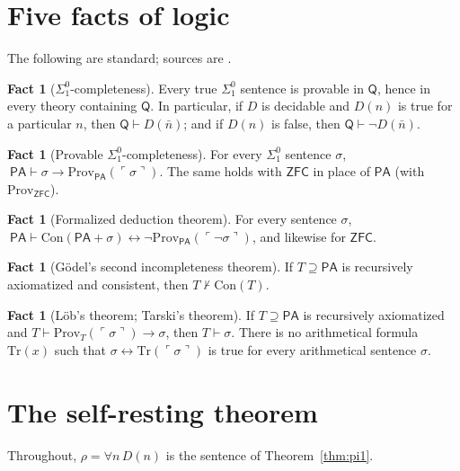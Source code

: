 \documentclass[11pt]{article}
\theoremstyle{definition}
\newtheorem{fact}[theorem]{Fact}
\theoremstyle{remark}
\newcommand{\PA}{\mathsf{PA}}
\newcommand{\ZFC}{\mathsf{ZFC}}
\newcommand{\RA}{\mathsf{Q}}
\newcommand{\Prov}{\mathrm{Prov}}
\newcommand{\Con}{\mathrm{Con}}
\newcommand{\gn}[1]{\ulcorner #1\urcorner}
\newcommand{\Sigone}{\Sigma^0_1}
\begin{document}
\section{Five facts of logic}\label{sec:facts}

The following are standard; sources are \cite{HP,Boolos,Smorynski}.

\begin{fact}[$\Sigone$-completeness]\label{fact:sigma}
Every true $\Sigone$ sentence is provable in $\RA$, hence in every theory containing $\RA$. In particular, if $D$ is decidable and $D(n)$ is true for a particular $n$, then $\RA\vdash D(\bar n)$; and if $D(n)$ is false, then $\RA\vdash\neg D(\bar n)$.
\end{fact}

\begin{fact}[Provable $\Sigone$-completeness]\label{fact:provsigma}
For every $\Sigone$ sentence $\sigma$, $\ \PA\vdash\sigma\to\Prov_\PA(\gn\sigma)$. The same holds with $\ZFC$ in place of $\PA$ (with $\Prov_\ZFC$).
\end{fact}

\begin{fact}[Formalized deduction theorem]\label{fact:ded}
For every sentence $\sigma$, $\ \PA\vdash\Con(\PA+\sigma)\leftrightarrow\neg\Prov_\PA(\gn{\neg\sigma})$, and likewise for $\ZFC$.
\end{fact}

\begin{fact}[G\"odel's second incompleteness theorem]\label{fact:g2}
If $T\supseteq\PA$ is recursively axiomatized and consistent, then $T\nvdash\Con(T)$.
\end{fact}

\begin{fact}[L\"ob's theorem; Tarski's theorem]\label{fact:lob}
If $T\supseteq\PA$ is recursively axiomatized and $T\vdash\Prov_T(\gn\sigma)\to\sigma$, then $T\vdash\sigma$. There is no arithmetical formula $\mathrm{Tr}(x)$ such that $\sigma\leftrightarrow\mathrm{Tr}(\gn\sigma)$ is true for every arithmetical sentence $\sigma$.
\end{fact}

\section{The self-resting theorem}\label{sec:self}

Throughout, $\rho=\forall n\,D(n)$ is the sentence of Theorem~\ref{thm:pi1}.
\end{document}
